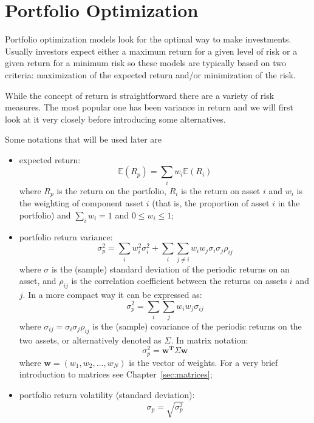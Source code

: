 \chapter{Portfolio Optimization}\label{portfolio-optimization}

Portfolio optimization models look for the optimal way to make investments. Usually investors expect either a maximum return for a given level of risk or a given return for a minimum risk so these models are typically based on two criteria: maximization of the expected return and/or minimization of the risk.

While the concept of return is straightforward there are a variety of risk measures. The most popular one has been variance in return and we will first look at it very closely before introducing some alternatives.

Some notations that will be used later are

\begin{itemize}
\tightlist
\item
  expected return: 
  \begin{equation} 
  	\mathbb{E}(R_{p}) = \sum _{i}w_{i} \mathbb{E}(R_{i}) 
  \end{equation} 
  where \(R_{p}\) is the return on the portfolio, \(R_{i}\) is the return on
  asset \(i\) and \(w_{i}\) is the weighting of component asset \(i\)
  (that is, the proportion of asset \(i\) in the portfolio) and
  \(\sum_{i}w_i = 1\) and \(0 \le w_i \le 1\);
\item
  portfolio return variance:
  \begin{equation} 
 	\sigma _{p}^{2} = \sum _{i}w_{i}^{2}\sigma _{i}^{2} + \sum _{i}\sum _{j\neq i}w_{i}w_{j}\sigma _{i}\sigma _{j}\rho _{ij} \end{equation}
  where \(\sigma\) is the (sample) standard deviation of the periodic
  returns on an asset, and \(\rho _{ij}\) is the correlation coefficient
  between the returns on assets \(i\) and \(j\). In a more compact way
  it can be expressed as:
  \begin{equation} 
  	\sigma _{p}^{2}=\sum _{i}\sum _{j}w_{i}w_{j}\sigma _{ij} 
  \end{equation} 
  where \(\sigma _{ij}=\sigma _{i}\sigma _{j}\rho _{ij}\) is the (sample)
  covariance of the periodic returns on the two assets, or alternatively
  denoted as \(\Sigma\).
  In matrix notation:
  \begin{equation}
  	\sigma_p^2 = \mathbf{w^T}\Sigma\mathbf{w} 
  \end{equation}
  where $\mathbf{w} = (w_1,w_2,\ldots,w_N)$ is the vector of weights. 
  For a very brief introduction to matrices see Chapter~\ref{sec:matrices};
\item
  portfolio return volatility (standard deviation):
  \begin{equation}
  	\sigma _{p}= \sqrt{\sigma _{p}^{2}}
  \end{equation}
\end{itemize}

